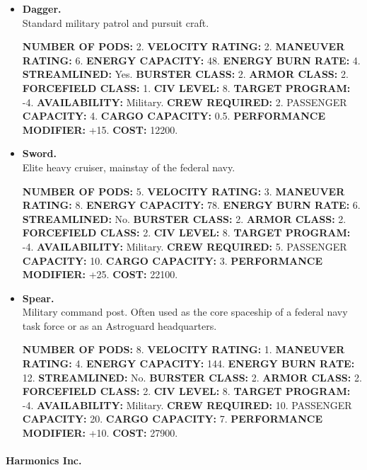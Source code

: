 \begin{itemize}
\item\textbf{Dagger.}\\
Standard military patrol and pursuit craft. 

\textbf{NUMBER OF PODS:} 2. \textbf{VELOCITY RATING:} 2.
\textbf{MANEUVER RATING:} 6. \textbf{ENERGY CAPACITY:} 48.
\textbf{ENERGY BURN RATE:} 4. \textbf{STREAMLINED:} Yes. \textbf{BURSTER
  CLASS:} 2. \textbf{ARMOR CLASS:} 2.  \textbf{FORCEFIELD CLASS:} 1.
\textbf{CIV LEVEL:} 8. \textbf{TARGET PROGRAM:} -4.
\textbf{AVAILABILITY:} Military. \textbf{CREW REQUIRED:} 2. PASSENGER
\textbf{CAPACITY:} 4. \textbf{CARGO CAPACITY:} 0.5.
\textbf{PERFORMANCE MODIFIER:} +15. \textbf{COST:} 12200.


\item\textbf{Sword.}\\
  Elite heavy cruiser, mainstay of the federal navy.
  
  \textbf{NUMBER OF PODS:} 5. \textbf{VELOCITY RATING:} 3.
  \textbf{MANEUVER RATING:} 8. \textbf{ENERGY CAPACITY:} 78.
  \textbf{ENERGY BURN RATE:} 6. \textbf{STREAMLINED:}
  No. \textbf{BURSTER CLASS:} 2. \textbf{ARMOR CLASS:} 2.
  \textbf{FORCEFIELD CLASS:} 2. \textbf{CIV LEVEL:} 8. \textbf{TARGET
    PROGRAM:} -4. \textbf{AVAILABILITY:} Military. \textbf{CREW
    REQUIRED:} 5. PASSENGER \textbf{CAPACITY:} 10. \textbf{CARGO
    CAPACITY:} 3. \textbf{PERFORMANCE MODIFIER:} +25. \textbf{COST:}
  22100.
  

\item\textbf{Spear.}\\
  Military command post. Often used as the core spaceship of a federal
  navy task force or as an Astroguard headquarters.
  
  \textbf{NUMBER OF PODS:} 8. \textbf{VELOCITY RATING:} 1.
  \textbf{MANEUVER RATING:} 4. \textbf{ENERGY CAPACITY:} 144.
  \textbf{ENERGY BURN RATE:} 12. \textbf{STREAMLINED:}
  No. \textbf{BURSTER CLASS:} 2. \textbf{ARMOR CLASS:} 2.
  \textbf{FORCEFIELD CLASS:} 2. \textbf{CIV LEVEL:} 8. \textbf{TARGET
    PROGRAM:} -4. \textbf{AVAILABILITY:} Military. \textbf{CREW
    REQUIRED:} 10. PASSENGER \textbf{CAPACITY:} 20. \textbf{CARGO
    CAPACITY:} 7. \textbf{PERFORMANCE MODIFIER:} +10. \textbf{COST:}
  27900.
\end{itemize}


\paragraph{Harmonics Inc.}
\label{sec:hulls-harmonics}

